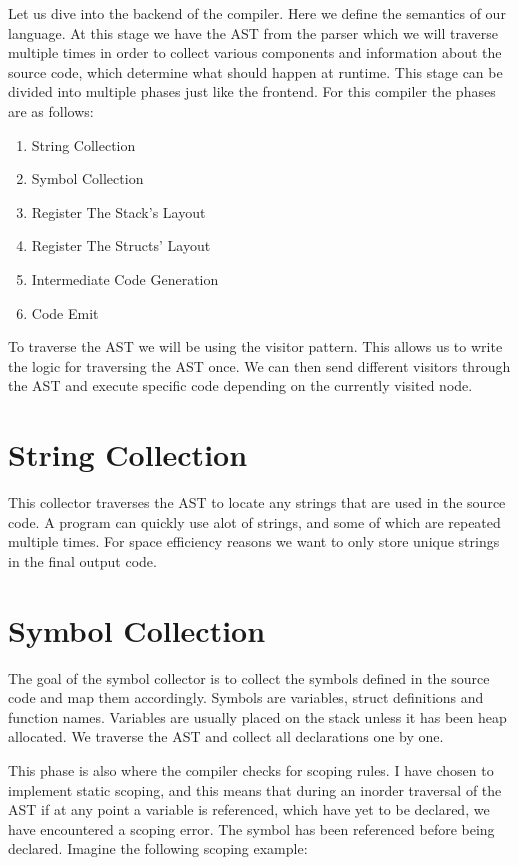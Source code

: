 Let us dive into the backend of the compiler. Here we define the semantics of our language. At this stage we have the AST from the parser which we will traverse multiple times in order to collect various components and information about the source code, which determine what should happen at runtime. This stage can be divided into multiple phases just like the frontend. For this compiler the phases are as follows: 
\begin{enumerate}
    \item String Collection
    \item Symbol Collection
    \item Register The Stack's Layout
    \item Register The Structs' Layout
    \item Intermediate Code Generation
    \item Code Emit
\end{enumerate}

To traverse the AST we will be using the visitor pattern. This allows us to write the logic for traversing the AST once. We can then send different visitors through the AST and execute specific code depending on the currently visited node.
\section{String Collection}

This collector traverses the AST to locate any strings that are used in the source code. A program can quickly use alot of strings, and some of which are repeated multiple times. For space efficiency reasons we want to only store unique strings in the final output code.

\section{Symbol Collection}
The goal of the symbol collector is to collect the symbols defined in the source code and map them accordingly. Symbols are variables, struct definitions and function names. Variables are usually placed on the stack unless it has been heap allocated. We traverse the AST and collect all declarations one by one. 

This phase is also where the compiler checks for scoping rules. I have chosen to implement static scoping, and this means that during an inorder traversal of the AST if at any point a variable is referenced, which have yet to be declared, we have encountered a scoping error. The symbol has been referenced before being declared. Imagine the following scoping example:

